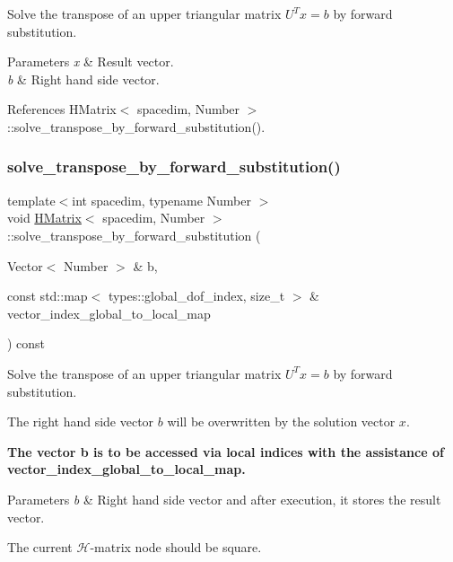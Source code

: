 Solve the transpose of an upper triangular matrix $U^Tx=b$ by forward substitution.


\begin{DoxyParams}{Parameters}
{\em x} & Result vector. \\
\hline
{\em b} & Right hand side vector. \\
\hline
\end{DoxyParams}


References H\+Matrix$<$ spacedim, Number $>$\+::solve\+\_\+transpose\+\_\+by\+\_\+forward\+\_\+substitution().

\mbox{\label{classHMatrix_aefa73f541d0b5eb8cddde5386fd140d0}} 
\subsubsection{\texorpdfstring{solve\+\_\+transpose\+\_\+by\+\_\+forward\+\_\+substitution()}{solve\_transpose\_by\_forward\_substitution()}\hspace{0.1cm}{\footnotesize\ttfamily [3/4]}}
{\footnotesize\ttfamily template$<$int spacedim, typename Number $>$ \\
void \hyperlink{classHMatrix}{H\+Matrix}$<$ spacedim, Number $>$\+::solve\+\_\+transpose\+\_\+by\+\_\+forward\+\_\+substitution (\begin{DoxyParamCaption}\item[{Vector$<$ Number $>$ \&}]{b,  }\item[{const std\+::map$<$ types\+::global\+\_\+dof\+\_\+index, size\+\_\+t $>$ \&}]{vector\+\_\+index\+\_\+global\+\_\+to\+\_\+local\+\_\+map }\end{DoxyParamCaption}) const}

Solve the transpose of an upper triangular matrix $U^Tx=b$ by forward substitution.

The right hand side vector $b$ will be overwritten by the solution vector $x$.

{\bfseries The vector {\ttfamily b} is to be accessed via local indices with the assistance of {\ttfamily vector\+\_\+index\+\_\+global\+\_\+to\+\_\+local\+\_\+map}.}


\begin{DoxyParams}{Parameters}
{\em b} & Right hand side vector and after execution, it stores the result vector. \\
\hline
\end{DoxyParams}
The current $\mathcal{H}$-\/matrix node should be square.

